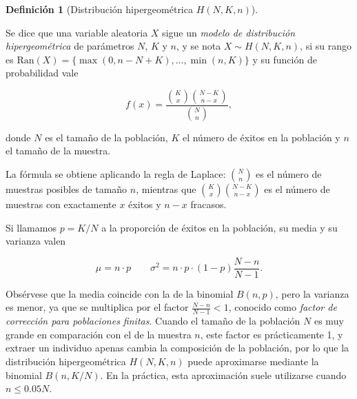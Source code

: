 \documentclass[
  spanish,
  a4paper,
]{scrreport}
\theoremstyle{plain}
\theoremstyle{definition}
\theoremstyle{definition}
\newtheorem{definition}{Definición}[chapter]
\theoremstyle{remark}
\begin{document}
\begin{definition}[Distribución hipergeométrica
\(H(N,K,n)\)]\protect\hypertarget{def-distribucion-hipergeometrica}{}\label{def-distribucion-hipergeometrica}

Se dice que una variable aleatoria \(X\) sigue un \emph{modelo de
distribución hipergeométrica} de parámetros \(N\), \(K\) y \(n\), y se
nota \(X\sim H(N,K,n)\), si su rango es
\(\mbox{Ran}(X) = \{\max(0,n-N+K),\ldots,\min(n,K)\}\) y su función de
probabilidad vale

\[
f(x) = \frac{\binom{K}{x}\binom{N-K}{n-x}}{\binom{N}{n}},
\]

donde \(N\) es el tamaño de la población, \(K\) el número de éxitos en
la población y \(n\) el tamaño de la muestra.

\end{definition}

La fórmula se obtiene aplicando la regla de Laplace: \(\binom{N}{n}\) es
el número de muestras posibles de tamaño \(n\), mientras que
\(\binom{K}{x}\binom{N-K}{n-x}\) es el número de muestras con
exactamente \(x\) éxitos y \(n-x\) fracasos.

Si llamamos \(p=K/N\) a la proporción de éxitos en la población, su
media y su varianza valen

\[
\mu = n\cdot p \qquad \sigma^2 = n\cdot p\cdot (1-p)\frac{N-n}{N-1}.
\]

Obsérvese que la media coincide con la de la binomial \(B(n,p)\), pero
la varianza es menor, ya que se multiplica por el factor
\(\frac{N-n}{N-1}<1\), conocido como \emph{factor de corrección para
poblaciones finitas}. Cuando el tamaño de la población \(N\) es muy
grande en comparación con el de la muestra \(n\), este factor es
prácticamente 1, y extraer un individuo apenas cambia la composición de
la población, por lo que la distribución hipergeométrica \(H(N,K,n)\)
puede aproximarse mediante la binomial \(B(n,K/N)\). En la práctica,
esta aproximación suele utilizarse cuando \(n\leq 0.05N\).
\end{document}

